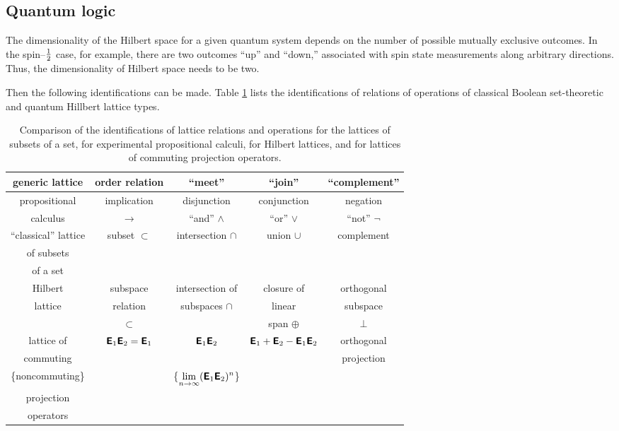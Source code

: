 {\subsection{Quantum logic}

The dimensionality of the Hilbert space for a given quantum system
depends on the number of possible mutually exclusive outcomes.
In the spin--${1\over 2}$ case, for example, there are two outcomes
``up'' and ``down,'' associated with spin state measurements along arbitrary directions.
Thus, the dimensionality of Hilbert space needs to be two.

Then the following identifications can be made.
Table
 \ref{tcompa} lists the identifications of relations of operations of
classical Boolean set-theoretic and quantum Hillbert lattice types.
\begin{table}
\begin{center}
{\footnotesize
 \begin{tabular}{|ccccc|} \hline\hline
 generic lattice  &  order relation   & ``meet''
&
``join''  & ``complement''\\
\hline
propositional&implication&disjunction&conjunction&negation\\
calculus&$\rightarrow$&``and'' $\wedge$&``or'' $\vee$&``not'' $\neg$\\
\hline
``classical'' lattice  &  subset $\subset $  & intersection $\cap$ &
union
$\cup$ & complement\\
of subsets&&&&\\
of a set&&&&\\
\hline
Hilbert & subspace& intersection of & closure of     & orthogonal \\
lattice & relation& subspaces $\cap$&  linear& subspace   \\
        & $\subset$ &                 & span $\oplus$  &  $\perp$   \\
\hline
lattice of& $\textsf{\textbf{E}}_1\textsf{\textbf{E}}_2=\textsf{\textbf{E}}_1$& $\textsf{\textbf{E}}_1\textsf{\textbf{E}}_2$& $\textsf{\textbf{E}}_1+\textsf{\textbf{E}}_2-\textsf{\textbf{E}}_1\textsf{\textbf{E}}_2$& orthogonal\\
commuting&&&&projection\\
\{noncommuting\}&&\{$\displaystyle\lim_{n\rightarrow \infty}(\textsf{\textbf{E}}_1\textsf{\textbf{E}}_2)^n$\}&&\\
projection&&&&\\
operators&&&&\\
 \hline\hline
 \end{tabular}
}
 \caption{Comparison of the identifications of lattice relations and
 operations for the lattices of subsets of a set, for
 experimental propositional calculi, for  Hilbert lattices, and for
lattices of commuting projection operators.
 \label{tcompa}}
 \end{center}
\end{table}


}
